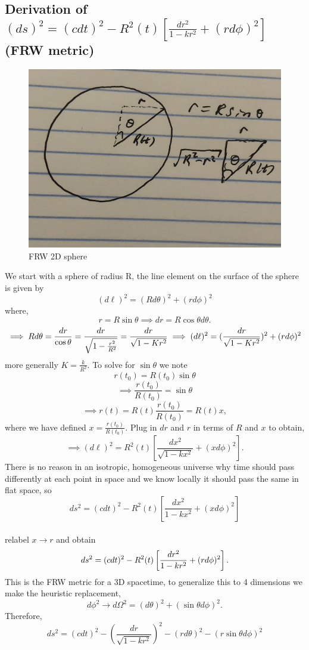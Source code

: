\documentclass[12pt]{amsart}
\begin{document}
\begin{enumerate}
\subsection{Derivation of $(ds)^2 = (c dt)^2 - R^2(t) \left [ \frac{dr^2}{1- k r^2} + ( r d \phi)^2 \right]$ (FRW metric)}
\begin{figure}[h!]
    \centering
    \includegraphics[scale=.15]{Figures/FRW_im.png}
    \caption{FRW 2D sphere}
    \label{fig:fig2}
\end{figure}
We start with a sphere of radius R, the line element on the surface of the sphere is given by
$$(d \ell)^2 = ( R d \theta)^2 + (r d \phi)^2$$
where,
$$r= R \sin \theta \implies dr = R \cos \theta d \theta.$$
$$\implies R d \theta = \frac{dr}{\cos \theta} = \frac{dr}{\sqrt{1- \frac{r^2}{R^2}}} = \frac{dr}{\sqrt{1- K r^2}}\\
\implies ( d \ell)^2 = ( \frac{dr}{\sqrt{ 1- K r^2}})^2 + (r d \phi)^2\\$$
more generally $K = \frac{k}{R^2}.$ To solve for $\sin \theta$ we note
$$r(t_0) = R(t_0) \sin \theta$$
$$\implies \frac{r(t_0)}{R(t_0)} = \sin \theta$$
$$\implies r(t) = R(t) \frac{r(t_0)}{R(t_0)} = R(t) x,$$
where we have defined $x= \frac{r(t_0)}{R(t_0)}.$ Plug in $dr$ and $r$ in terms of $R$ and $x$ to obtain,
$$\implies (d \ell)^2 = R^2(t) \left [ \frac{dx^2}{\sqrt{1 - k x^2}} + ( x d \phi)^2 \right].$$
There is no reason in an isotropic, homogeneous universe why time should pass differently at each point in space and we know locally it should pass the same in flat space, so\\
$$ds^2 = (c dt)^2 - R^2(t) \left[ \frac{dx^2}{1-k x^2} + ( x d \phi)^2 \right]$$\\
relabel
$x \rightarrow r$ and obtain\\
$$ ds^2 = (c dt)^2 - R^2(t) \left[ \frac{dr^2}{1- kr^2} + (r d \phi)^2 \right].\\$$
This is the FRW metric for a 3D spacetime, to generalize this to 4 dimensions we make the heuristic replacement,
$$d \phi^2 \rightarrow d\Omega^2= (d \theta)^2 + (\sin \theta d \phi)^2.$$
Therefore,\\
$$ds^2= (c dt)^2 - ( \frac{dr}{\sqrt{1-k r^2}})^2 - (r d \theta)^2 - (r \sin \theta d \phi)^2$$



\end{enumerate}
\end{document}
